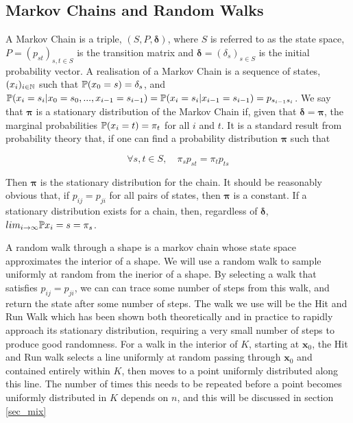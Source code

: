 \subsection{Markov Chains and Random Walks}

A Markov Chain is a triple, $(S,P,\bm{\delta})$, where $S$ is referred to as the state space, $P = (p_{st})_{s,t \in S}$ is the transition matrix and $\bm{\delta} = (\delta_s)_{s \in S}$ is the initial probability vector. A realisation of a Markov Chain is a sequence of states, $(x_i)_{i \in \mathbb{N}}$ such that $\mathbb{P} (x_0 = s)=\delta_s$, and $\mathbb{P}(x_i = s_i | x_0 = s_0, ..., x_{i-1} = s_{i-1}) = \mathbb{P} (x_i = s_i | x_{i-1} = s_{i-1})= p_{s_{i-1}s_{i}}$. We say that $\bm{\pi}$ is a stationary distribution of the Markov Chain if, given that $\bm{\delta} = \bm{\pi}$, the marginal probabilities $\mathbb{P}(x_i = t) = \pi_t$ for all $i$ and $t$.  It is a standard result from probability theory that, if one can find a probability distribution $\bm{\pi}$ such that

$$
\forall s,t \in S, \quad \pi_s p_{st} = \pi_t p_{ts}
$$

Then $\bm{\pi}$ is the stationary distribution for the chain. It should be reasonably obvious that, if $p_{ij} = p_{ji}$ for all pairs of states, then $\bm{\pi}$ is a constant. If a stationary distribution exists for a chain, then, regardless of $\bm{\delta}$, $lim_{i-> \infty} \mathbb{P} {x_i = s} = \pi_s$.

A random walk through a shape is a markov chain whose state space approximates the interior of a shape. We will use a random walk to sample uniformly at random from the inerior of a shape. By selecting a walk that satisfies $p_{ij} = p_{ji}$, we can can trace some number of steps from this walk, and return the state after some number of steps. The walk we use will be the Hit and Run Walk %
which has been shown both theoretically and in practice to rapidly approach its stationary distribution, requiring a very small number of steps to produce good randomness. For a walk in the interior of $K$, starting at $\bm{x}_0$, the Hit and Run walk selects a line uniformly at random passing through $\bm{x}_0$ and contained entirely within $K$, then moves to a point uniformly distributed along this line. The number of times this needs to be repeated before a point becomes uniformly distributed in $K$ depends on $n$, and this will be discussed in section \ref{sec_mix}

